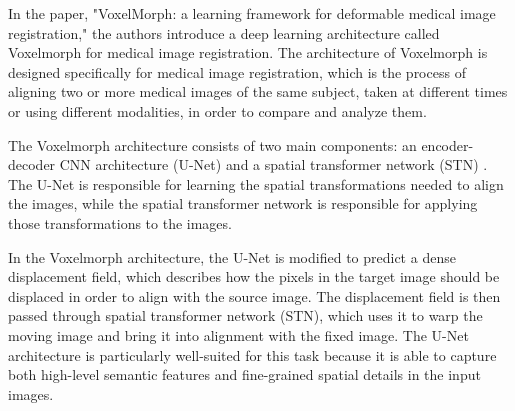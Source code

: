 \documentclass{report}
\begin{document}
	In the paper, "VoxelMorph: a learning framework for deformable medical image registration," \cite{Balakrishnan_2019} the authors introduce a deep learning architecture called Voxelmorph for medical image registration. The architecture of Voxelmorph is designed specifically for medical image registration, which is the process of aligning two or more medical images of the same subject, taken at different times or using different modalities, in order to compare and analyze them.
	
	The Voxelmorph architecture consists of two main components: an encoder-decoder CNN architecture (U-Net) \cite{UNet} and a spatial transformer network (STN) \cite{NIPS2015_33ceb07b}. The U-Net is responsible for learning the spatial transformations needed to align the images, while the spatial transformer network is responsible for applying those transformations to the images.
	
	In the Voxelmorph architecture, the U-Net is modified to predict a dense displacement field, which describes how the pixels in the target image should be displaced in order to align with the source image. The displacement field is then passed through spatial transformer network (STN), which uses it to warp the moving image and bring it into alignment with the fixed image. The U-Net architecture is particularly well-suited for this task because it is able to capture both high-level semantic features and fine-grained spatial details in the input images.
	
\end{document}
